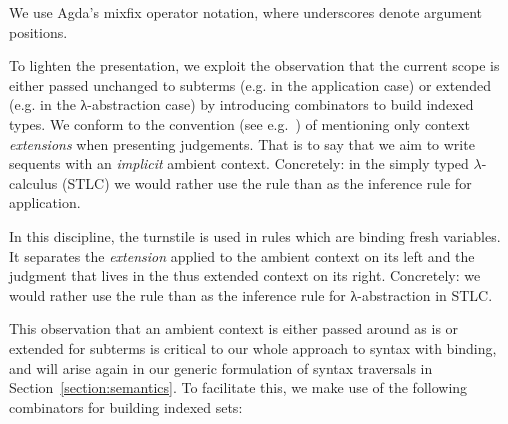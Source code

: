 \begin{agdasnippet}
\end{agdasnippet}
%
We use Agda's mixfix operator notation, where underscores denote
argument positions.

To lighten the presentation, we exploit the observation that the
current scope is either passed unchanged to subterms (e.g. in the
application case) or extended (e.g. in the λ-abstraction case) by
introducing combinators to build indexed types. We conform to the
convention (see e.g.~\citet{martin1982constructive}) of mentioning
only context \emph{extensions} when presenting judgements.
That is
to say that we aim to write sequents with an \emph{implicit} ambient
context. Concretely: in the simply typed
$\lambda$-calculus (STLC) we would rather use the rule  than
 as the inference rule for application.


In this discipline, the turnstile is used in rules which are binding
fresh variables. It separates the \emph{extension} applied to the ambient
context on its left and the judgment that lives in the thus extended
context on its right. Concretely: we would rather use the rule 
than  as the inference rule for λ-abstraction in STLC.


This observation that an ambient context is either passed around as is
or extended for subterms is critical to our whole approach to syntax
with binding, and will arise again in our generic formulation of
syntax traversals in Section~\ref{section:semantics}. To facilitate
this, we make use of the following combinators for building indexed
sets:

\noindent
\begin{minipage}{\textwidth}
  \begin{minipage}{0.5\textwidth}
  \end{minipage}\hfill
  \begin{minipage}{0.5\textwidth}
  \end{minipage}
\end{minipage}

